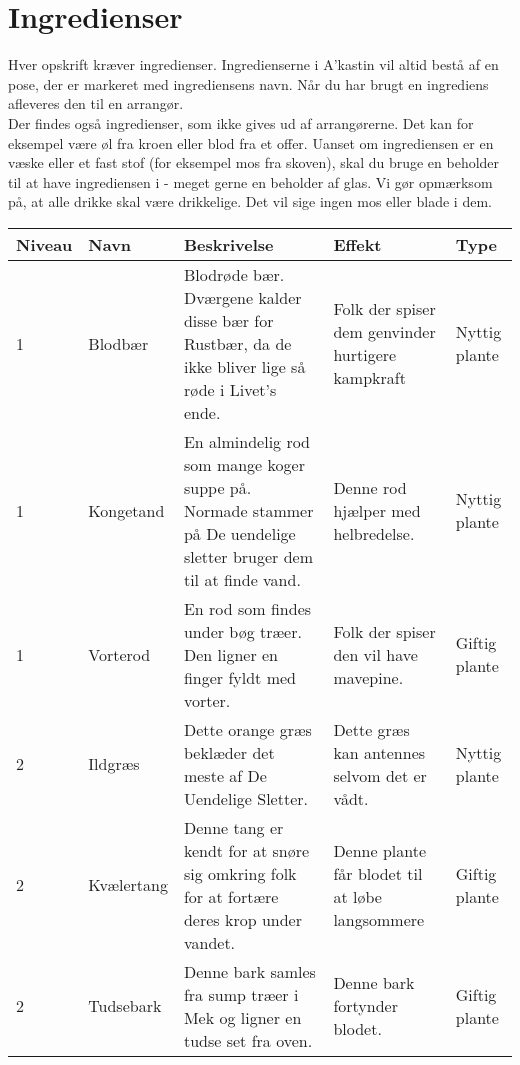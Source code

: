 \chapter{Ingredienser}
Hver opskrift kræver ingredienser. Ingredienserne i A'kastin vil altid bestå af en pose, der er markeret med ingrediensens navn. Når du har brugt en ingrediens afleveres den til en arrangør.\\
Der findes også ingredienser, som ikke gives ud af arrangørerne. Det kan for eksempel være øl fra kroen eller blod fra et offer. Uanset om ingrediensen er en væske eller et fast stof (for eksempel mos fra skoven), skal du bruge en beholder til at have ingrediensen i - meget gerne en beholder af glas. Vi gør opmærksom på, at alle drikke skal være drikkelige. Det vil sige ingen mos eller blade i dem.
\begin{center}
\begin{longtable}{|p{}|p{}|p{}|p{}|p{}|}
\hline
\rowcolor{cerulean!80}
Niveau & Navn & Beskrivelse & Effekt & Type \\\hline
\endhead

\hline \hline
\endlastfoot

1 & Blodbær &  Blodrøde bær. Dværgene kalder disse bær for Rustbær, da de ikke bliver lige så røde i Livet's ende. & Folk der spiser dem genvinder hurtigere kampkraft & Nyttig plante\\\hline
        
1 & Kongetand & En almindelig rod som mange koger suppe på. Normade stammer på De uendelige sletter bruger dem til at finde vand. & Denne rod hjælper med helbredelse. & Nyttig plante\\\hline

1 & Vorterod & En rod som findes under bøg træer. Den ligner en finger fyldt med vorter. & Folk der spiser den vil have mavepine. & Giftig plante \\\hline

2 & Ildgræs & Dette orange græs beklæder det meste af De Uendelige Sletter. & Dette græs kan antennes selvom det er vådt. & Nyttig plante \\\hline

2 & Kvælertang & Denne tang er kendt for at snøre sig omkring folk for at fortære deres krop under vandet. & Denne plante får blodet til at løbe langsommere & Giftig plante \\\hline

2 & Tudsebark & Denne bark samles fra sump træer i Mek og ligner en tudse set fra oven. & Denne bark fortynder blodet. & Giftig plante \\\hline


\end{longtable}
\end{center}
